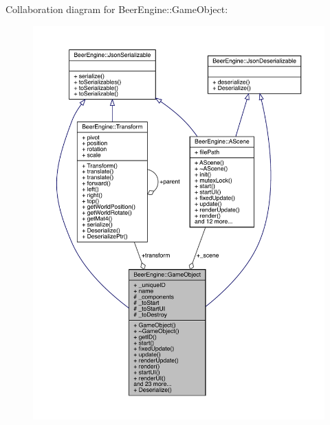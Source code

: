 Collaboration diagram for Beer\+Engine\+:\+:Game\+Object\+:\nopagebreak
\begin{figure}[H]
\begin{center}
\leavevmode
\includegraphics[width=350pt]{class_beer_engine_1_1_game_object__coll__graph}
\end{center}
\end{figure}
